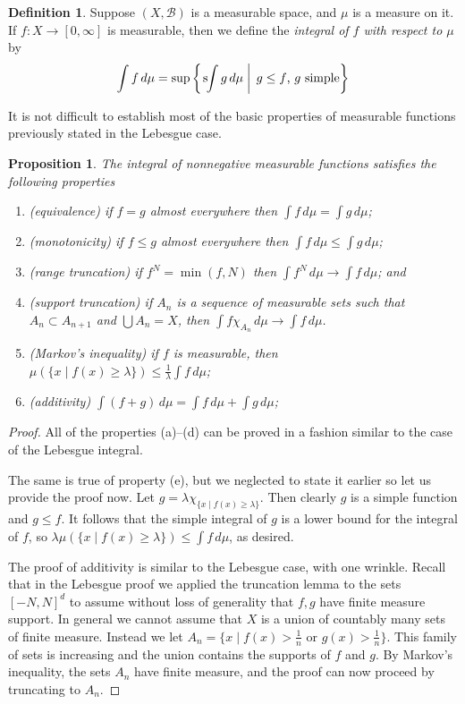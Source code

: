 \documentclass[10pt,oneside]{amsbook}
\newcommand{\sint}{\text{s}\kern-3pt\int}
\theoremstyle{definition}
\theoremstyle{plain}
\newtheorem{prop}[thm]{Proposition}
\theoremstyle{definition}
\newtheorem{defn}[thm]{Definition}
\theoremstyle{remark}
\numberwithin{equation}{section}
\numberwithin{figure}{section}
\begin{document}
\begin{defn}
  Suppose $(X,\mathcal B)$ is a measurable space, and $\mu$ is a measure on it. If $f\colon X\to[0,\infty]$ is measurable, then we define the \emph{integral of $f$ with respect to $\mu$} by
  \[\int f\,d\mu=\sup\left\{\left.\sint g\,d\mu\;\right|\;g\leq f\text{, $g$ simple}\right\}
  \]
\end{defn}

It is not difficult to establish most of the basic properties of measurable functions previously stated in the Lebesgue case.

\begin{prop}
  The integral of nonnegative measurable functions satisfies the following properties
  \begin{enumerate}
  \item (equivalence) if $f=g$ almost everywhere then $\int f\,d\mu=\int g\,d\mu$;
  \item (monotonicity) if $f\leq g$ almost everywhere then $\int f\,d\mu\leq\int g\,d\mu$;
  \item (range truncation) if $f^N=\min(f,N)$ then $\int f^N\,d\mu\to\int f\,d\mu$; and
  \item (support truncation) if $A_n$ is a sequence of measurable sets such that $A_n\subset A_{n+1}$ and $\bigcup A_n=X$, then $\int f\chi_{A_n}\,d\mu\to\int f\,d\mu$.
  \item (Markov's inequality) if $f$ is measurable, then $\mu(\{x\mid f(x)\geq\lambda\})\leq\frac1\lambda\int f\,d\mu$;
  \item (additivity) $\int(f+g)\,d\mu=\int f\,d\mu+\int g\,d\mu$;
  \end{enumerate}
\end{prop}

\begin{proof}
  All of the properties (a)--(d) can be proved in a fashion similar to the case of the Lebesgue integral.

  The same is true of property (e), but we neglected to state it earlier so let us provide the proof now. Let $g=\lambda\chi_{\{x\mid f(x)\geq\lambda\}}$. Then clearly $g$ is a simple function and $g\leq f$. It follows that the simple integral of $g$ is a lower bound for the integral of $f$, so $\lambda\mu(\{x\mid f(x)\geq\lambda\})\leq\int f\,d\mu$, as desired.

  The proof of additivity is similar to the Lebesgue case, with one wrinkle. Recall that in the Lebesgue proof we applied the truncation lemma to the sets $[-N,N]^d$ to assume without loss of generality that $f,g$ have finite measure support. In general we cannot assume that $X$ is a union of countably many sets of finite measure. Instead we let $A_n=\{x\mid f(x)>\frac1n\text{ or }g(x)>\frac1n\}$. This family of sets is increasing and the union contains the supports of $f$ and $g$. By Markov's inequality, the sets $A_n$ have finite measure, and the proof can now proceed by truncating to $A_n$.
\end{proof}
\end{document}
